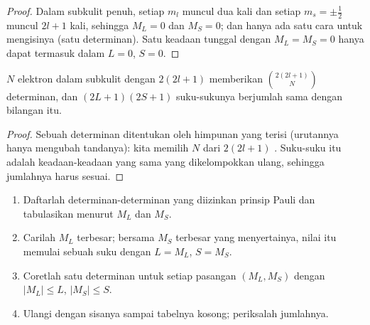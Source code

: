\begin{proof}
Dalam subkulit penuh, setiap $m_l$ muncul dua kali dan setiap $m_s = \pm\frac12$
muncul $2l+1$ kali, sehingga $M_L = 0$ dan $M_S = 0$; dan hanya ada satu cara
untuk mengisinya (satu determinan). Satu keadaan tunggal dengan
$M_L = M_S = 0$ hanya dapat termasuk dalam $L = 0$, $S = 0$.
\end{proof}

\begin{proposition}\label{prop:b3:many-electron-atoms:count}
$N$ elektron dalam subkulit dengan $2(2l+1)$  memberikan
$\binom{2(2l+1)}{N}$ determinan, dan  $(2L+1)(2S+1)$ suku-sukunya
berjumlah sama dengan bilangan itu.
\end{proposition}

\begin{proof}
Sebuah determinan ditentukan oleh himpunan  yang terisi (urutannya
hanya mengubah tandanya): kita memilih $N$ dari $2(2l+1)$ . Suku-suku
itu adalah keadaan-keadaan yang sama yang dikelompokkan ulang, sehingga
jumlahnya harus sesuai.
\end{proof}

\begin{method}\label{met:b3:many-electron-atoms:terms}
\begin{enumerate}
  \item Daftarlah determinan-determinan yang diizinkan prinsip Pauli dan
        tabulasikan menurut $M_L$ dan $M_S$.
  \item Carilah $M_L$ terbesar; bersama $M_S$ terbesar yang menyertainya,
        nilai itu memulai sebuah suku dengan $L = M_L$, $S = M_S$.
  \item Coretlah satu determinan untuk setiap pasangan $(M_L, M_S)$ dengan
        $|M_L| \le L$, $|M_S| \le S$.
  \item Ulangi dengan sisanya sampai tabelnya kosong; periksalah jumlahnya.
\end{enumerate}
\end{method}

